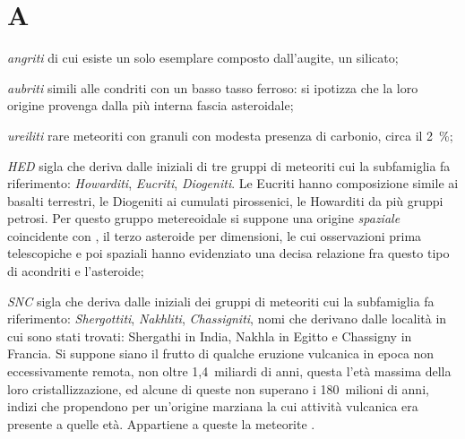 \documentclass[openany,9pt,italian,ifnoinputencoding]{dictionaryCD}
\begin{document}
	\chapter{A}
	\vspace{20mm} 

	
	
	
	
	
\begin{compactitem}
	\item[\textit{angriti}] di cui esiste un solo esemplare composto dall'augite, un silicato;
	\item[\textit{aubriti}] simili alle condriti con un basso tasso ferroso: si ipotizza che la loro origine provenga dalla più interna fascia asteroidale;
	\item[\textit{ureiliti}] rare meteoriti con granuli con modesta presenza di carbonio, circa il 2~\%;
	\item[\textit{HED}] sigla che deriva dalle iniziali di tre gruppi  di meteoriti cui la subfamiglia fa riferimento: \textit{Howarditi}, \textit{Eucriti}, \textit{Diogeniti}. Le Eucriti hanno composizione simile ai basalti terrestri, le Diogeniti ai cumulati pirossenici, le Howarditi da più gruppi petrosi. Per questo gruppo metereoidale si suppone una origine \textit{spaziale} coincidente con , il terzo asteroide per dimensioni, le cui osservazioni prima telescopiche e poi spaziali hanno evidenziato una decisa relazione fra questo tipo di acondriti e l'asteroide;
	\item[\textit{SNC}] sigla che deriva dalle iniziali dei gruppi di meteoriti cui la subfamiglia fa riferimento: \textit{Shergottiti}, \textit{Nakhliti}, \textit{Chassigniti}, nomi che derivano dalle località in cui sono stati trovati: Shergathi in India, Nakhla in Egitto e Chassigny in Francia. Si suppone siano il frutto di qualche eruzione vulcanica in epoca non eccessivamente remota, non oltre 1,4~miliardi di anni, questa l'età massima della loro cristallizzazione, ed alcune di queste non superano i 180~milioni di anni, indizi che propendono per un'origine marziana la cui attività vulcanica era presente a quelle età. Appartiene a queste la  meteorite .
\end{compactitem}	
\end{document}
